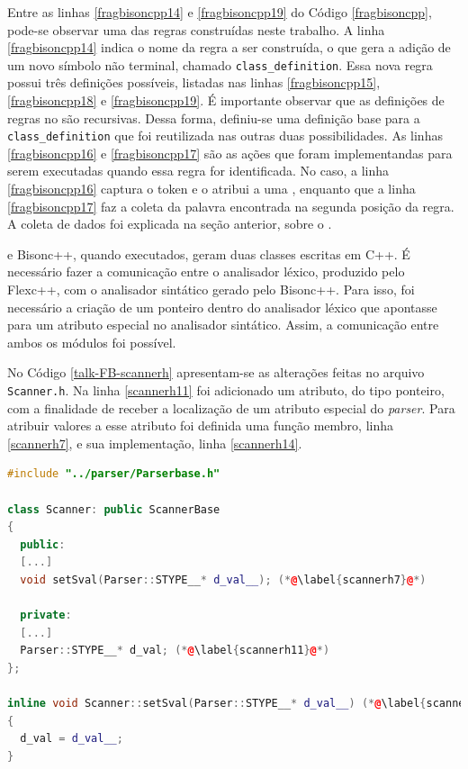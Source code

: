 Entre as linhas \ref{fragbisoncpp14} e \ref{fragbisoncpp19} do Código
\ref{fragbisoncpp}, pode-se observar uma das regras construídas neste trabalho.
A linha \ref{fragbisoncpp14} indica o nome da regra a ser construída, o que
gera a adição de um novo símbolo não terminal, chamado
\lstinline|class_definition|. Essa nova regra possui três definições possíveis,
listadas nas linhas \ref{fragbisoncpp15}, \ref{fragbisoncpp18} e
\ref{fragbisoncpp19}. É importante observar que as definições de regras no
\bisoncpp são recursivas. Dessa forma, definiu-se uma definição base para a
\lstinline|class_definition| que foi reutilizada nas outras duas possibilidades.
As linhas \ref{fragbisoncpp16} e \ref{fragbisoncpp17} são as ações que foram
implementandas para serem executadas quando essa regra for identificada.
No caso, a linha \ref{fragbisoncpp16} captura o token e o atribui a uma \str,
enquanto que a linha \ref{fragbisoncpp17} faz a coleta da
palavra encontrada na segunda posição da regra. A coleta de dados foi explicada na
seção anterior, sobre o \Scarefault.

\flexcpp e \textsf{Bisonc++}, quando executados, geram duas classes escritas
em C++.
É necessário fazer a comunicação entre o analisador léxico, produzido pelo
\textsf{Flexc++}, com o analisador sintático gerado pelo \textsf{Bisonc++}.
Para isso, foi necessário a criação de um ponteiro dentro do analisador
léxico que apontasse para um atributo especial no analisador sintático.
Assim, a comunicação entre ambos os módulos foi possível.

No Código \ref{talk-FB-scannerh} apresentam-se as alterações feitas no
arquivo \lstinline|Scanner.h|. Na linha \ref{scannerh11} foi adicionado um atributo,
do tipo ponteiro, com a finalidade de receber a localização de um atributo especial
do \textit{parser}. Para atribuir valores a esse atributo foi definida uma
função membro, linha \ref{scannerh7}, e sua implementação, linha \ref{scannerh14}.
\begin{lstlisting}[language=C++, label=talk-FB-scannerh, caption=Alterações no Scanner.h para comunicação entre Analisador Léxico e Sintático]
#include "../parser/Parserbase.h"

class Scanner: public ScannerBase
{
  public:
  [...]
  void setSval(Parser::STYPE__* d_val__); (*@\label{scannerh7}@*)

  private:
  [...]
  Parser::STYPE__* d_val; (*@\label{scannerh11}@*)
};

inline void Scanner::setSval(Parser::STYPE__* d_val__) (*@\label{scannerh14}@*)
{
  d_val = d_val__;
}
\end{lstlisting}

